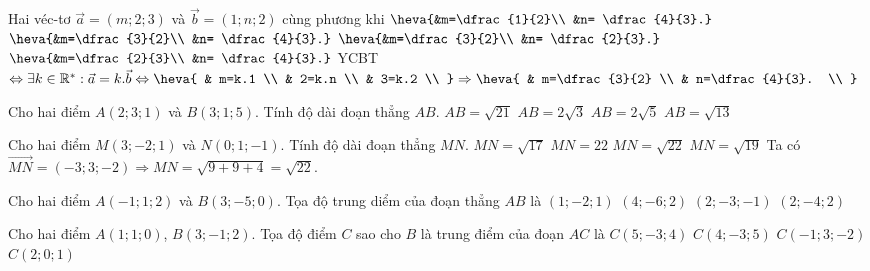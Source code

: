 \begin{ex}
	Hai véc-tơ $\vec{a}= (m; 2; 3)$ và $\vec{b}= (1; n; 2)$ cùng phương khi
	\choice
	{$\heva{&m=\dfrac{1}{2}\\ &n= \dfrac{4}{3}.}$}
	{\True $\heva{&m=\dfrac{3}{2}\\ &n= \dfrac{4}{3}.}$}
	{$\heva{&m=\dfrac{3}{2}\\ &n= \dfrac{2}{3}.}$}
	{$\heva{&m=\dfrac{2}{3}\\ &n= \dfrac{4}{3}.}$}
	\loigiai
	{
		YCBT $\Leftrightarrow \exists k\in {{\mathbb{R}}^{*}}:\vec{a}=k.\vec{b}\Leftrightarrow \heva{
				& m=k.1 \\
				& 2=k.n \\
				& 3=k.2 \\
			}\Rightarrow \heva{
				& m=\dfrac{3}{2} \\
				& n=\dfrac{4}{3}. \\
			}$
	}
\end{ex} 

\begin{ex}
	Cho hai điểm $A(2;3;1)$ và  $B(3;1;5)$. Tính độ dài đoạn thẳng $AB$.
	\choice
	{\True  $AB= \sqrt{21}$}
	{$AB= 2\sqrt{3}$}
	{$AB= 2\sqrt{5}$}
	{$AB= \sqrt{13}$}
\end{ex} 

\begin{ex}
	Cho hai điểm $M(3;-2;1)$ và $N(0;1;-1)$. Tính độ dài đoạn thẳng $MN$.
	\choice
	{$MN=\sqrt{17}$}
	{$MN=22$}
	{\True $MN=\sqrt{22}$}
	{$MN=\sqrt{19}$}
	\loigiai
	{
		Ta có $\vec{MN}=(-3;3;-2)\Rightarrow MN=\sqrt{9+9+4}=\sqrt{22}$.
	}
\end{ex} 

\begin{ex}
	Cho hai điểm $A(-1;1;2)$ và $B(3;-5;0)$. Tọa độ trung diểm của đoạn thẳng $AB$ là
	\choice
	{\True $(1;-2;1)$}
	{$(4;-6;2)$}
	{$(2;-3;-1)$}
	{$(2;-4;2)$}
\end{ex} 

\begin{ex}
	Cho hai điểm $A(1;1;0)$, $B(3;-1;2)$. Tọa độ điểm $C$ sao cho $B$ là trung điểm của đoạn $AC$ là
	\choice
	{\True $C(5;-3;4)$}
	{$C(4;-3;5)$}
	{$C(-1;3;-2)$}
	{$C(2;0;1)$}
\end{ex} 


